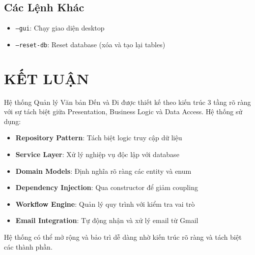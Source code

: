 \documentclass[12pt,a4paper]{article}
\begin{document}
\subsection{Các Lệnh Khác}
\begin{itemize}
    \item \texttt{--gui}: Chạy giao diện desktop
    \item \texttt{--reset-db}: Reset database (xóa và tạo lại tables)
\end{itemize}

\section{KẾT LUẬN}

Hệ thống Quản lý Văn bản Đến và Đi được thiết kế theo kiến trúc 3 tầng rõ ràng với sự tách biệt giữa Presentation, Business Logic và Data Access. Hệ thống sử dụng:

\begin{itemize}
    \item \textbf{Repository Pattern}: Tách biệt logic truy cập dữ liệu
    \item \textbf{Service Layer}: Xử lý nghiệp vụ độc lập với database
    \item \textbf{Domain Models}: Định nghĩa rõ ràng các entity và enum
    \item \textbf{Dependency Injection}: Qua constructor để giảm coupling
    \item \textbf{Workflow Engine}: Quản lý quy trình với kiểm tra vai trò
    \item \textbf{Email Integration}: Tự động nhận và xử lý email từ Gmail
\end{itemize}

Hệ thống có thể mở rộng và bảo trì dễ dàng nhờ kiến trúc rõ ràng và tách biệt các thành phần.
\end{document}
